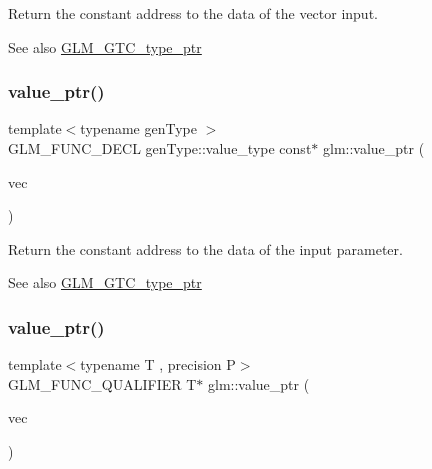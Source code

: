 Return the constant address to the data of the vector input. \begin{DoxySeeAlso}{See also}
\hyperlink{group__gtc__type__ptr}{G\+L\+M\+\_\+\+G\+T\+C\+\_\+type\+\_\+ptr} 
\end{DoxySeeAlso}
\mbox{\label{group__gtc__type__ptr_gaf019636bb8bd7c9efb7c7ce3bb23bcfc}} 
\subsubsection{\texorpdfstring{value\+\_\+ptr()}{value\_ptr()}\hspace{0.1cm}{\footnotesize\ttfamily [6/27]}}
{\footnotesize\ttfamily template$<$typename gen\+Type $>$ \\
G\+L\+M\+\_\+\+F\+U\+N\+C\+\_\+\+D\+E\+CL gen\+Type\+::value\+\_\+type const$\ast$ glm\+::value\+\_\+ptr (\begin{DoxyParamCaption}\item[{gen\+Type const \&}]{vec }\end{DoxyParamCaption})}

Return the constant address to the data of the input parameter. \begin{DoxySeeAlso}{See also}
\hyperlink{group__gtc__type__ptr}{G\+L\+M\+\_\+\+G\+T\+C\+\_\+type\+\_\+ptr} 
\end{DoxySeeAlso}
\mbox{\label{group__gtc__type__ptr_ga4c19763f3c5991b9dc88a3ffdd9ea6cd}} 
\subsubsection{\texorpdfstring{value\+\_\+ptr()}{value\_ptr()}\hspace{0.1cm}{\footnotesize\ttfamily [7/27]}}
{\footnotesize\ttfamily template$<$typename T , precision P$>$ \\
G\+L\+M\+\_\+\+F\+U\+N\+C\+\_\+\+Q\+U\+A\+L\+I\+F\+I\+ER T$\ast$ glm\+::value\+\_\+ptr (\begin{DoxyParamCaption}\item[{\hyperlink{structglm_1_1tvec4}{tvec4}$<$ T, P $>$ \&}]{vec }\end{DoxyParamCaption})}

